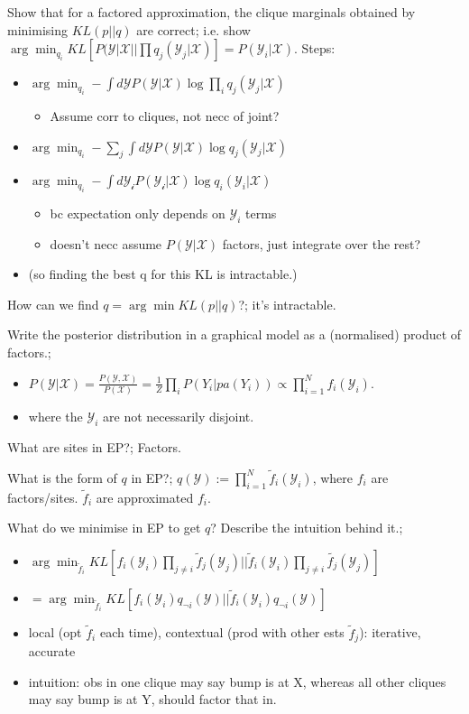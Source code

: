\documentclass{article}
\begin{document}
Show that for a factored approximation, the clique marginals obtained by minimising $KL(p||q)$ are correct; i.e. show $\arg\min_{q_i} KL[P(\mathcal{Y}|\mathcal{X}||\prod q_j(\mathcal{Y}_j|\mathcal{X})]=P(\mathcal{Y}_i|\mathcal{X})$. Steps: \begin{itemize} \item $\arg\min_{q_i}-\int d\mathcal{Y}P(\mathcal{Y}|\mathcal{X})\log \prod_iq_j(\mathcal{Y}_j|\mathcal{X})$ \begin{itemize} \item Assume corr to cliques, not necc of joint? \end{itemize} \item $\arg\min_{q_i}-\sum_j \int d\mathcal{Y}P(\mathcal{Y}|\mathcal{X})\log q_j(\mathcal{Y}_j|\mathcal{X})$ \item $\arg\min_{q_i}-\int d\mathcal{Y_i}P(\mathcal{Y_i}|\mathcal{X})\log q_i(\mathcal{Y}_i|\mathcal{X})$ \begin{itemize} \item bc expectation only depends on $\mathcal{Y}_i$ terms \item doesn't necc assume $P(\mathcal{Y}|\mathcal{X})$ factors, just integrate over the rest? \end{itemize} \item (so finding the best q for this KL is intractable.) \end{itemize}

How can we find $q=\arg\min KL(p||q)$?; it's intractable.

Write the posterior distribution in a graphical model as a (normalised) product of factors.;\begin{itemize} \item  $P(\mathcal{Y}|\mathcal{X})=\frac{P(\mathcal{Y}, \mathcal{X})}{P(\mathcal{X})}=\frac{1}{Z}\prod_i P(Y_i|pa(Y_i))\propto \prod_{i=1}^N f_i(\mathcal{Y}_i)$. \item where the $\mathcal{Y}_i$ are not necessarily disjoint. \end{itemize} 

What are sites in EP?; Factors.

What is the form of $q$ in EP?; $q(\mathcal{Y}):=\prod_{i=1}^N\tilde{f}_i(\mathcal{Y}_i)$, where $f_i$ are factors/sites. $\tilde{f}_i$ are approximated $f_i$.

What do we minimise in EP to get $q$? Describe the intuition behind it.; \begin{itemize} \item $\arg\min_{\tilde{f}_i}KL[f_i(\mathcal{Y}_i)\prod_{j\ne i}\tilde{f}_j(\mathcal{Y}_j)||\tilde{f}_i(\mathcal{Y}_i)\prod_{j\ne i}\tilde{f_j}(\mathcal{Y}_j)]$ \item $=\arg\min_{\tilde{f}_i}KL[f_i(\mathcal{Y}_i)q_{\neg i}(\mathcal{Y})||\tilde{f}_i(\mathcal{Y}_i)q_{\neg i}(\mathcal{Y})]$ \item local (opt $\tilde{f}_i$ each time), contextual (prod with other ests $\tilde{f}_j$): iterative, accurate \item intuition: obs in one clique may say bump is at X, whereas all  other cliques may say bump is at Y, should factor that in. \end{itemize}  
\end{document}
